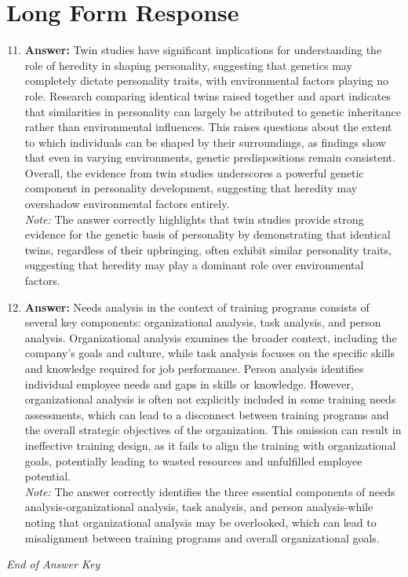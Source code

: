 \documentclass[12pt]{article}
\begin{document}
\section*{Long Form Response}
\begin{enumerate}[label=\arabic*.]
\setcounter{enumi}{10}
\item \textbf{Answer:} Twin studies have significant implications for understanding the role of heredity in shaping personality, suggesting that genetics may completely dictate personality traits, with environmental factors playing no role. Research comparing identical twins raised together and apart indicates that similarities in personality can largely be attributed to genetic inheritance rather than environmental influences. This raises questions about the extent to which individuals can be shaped by their surroundings, as findings show that even in varying environments, genetic predispositions remain consistent. Overall, the evidence from twin studies underscores a powerful genetic component in personality development, suggesting that heredity may overshadow environmental factors entirely.
\\ \textit{Note:} The answer correctly highlights that twin studies provide strong evidence for the genetic basis of personality by demonstrating that identical twins, regardless of their upbringing, often exhibit similar personality traits, suggesting that heredity may play a dominant role over environmental factors.
\item \textbf{Answer:} Needs analysis in the context of training programs consists of several key components: organizational analysis, task analysis, and person analysis. Organizational analysis examines the broader context, including the company's goals and culture, while task analysis focuses on the specific skills and knowledge required for job performance. Person analysis identifies individual employee needs and gaps in skills or knowledge. However, organizational analysis is often not explicitly included in some training needs assessments, which can lead to a disconnect between training programs and the overall strategic objectives of the organization. This omission can result in ineffective training design, as it fails to align the training with organizational goals, potentially leading to wasted resources and unfulfilled employee potential.
\\ \textit{Note:} The answer correctly identifies the three essential components of needs analysis-organizational analysis, task analysis, and person analysis-while noting that organizational analysis may be overlooked, which can lead to misalignment between training programs and overall organizational goals.
\end{enumerate}

\vfill
\noindent\textit{End of Answer Key}
\end{document}
